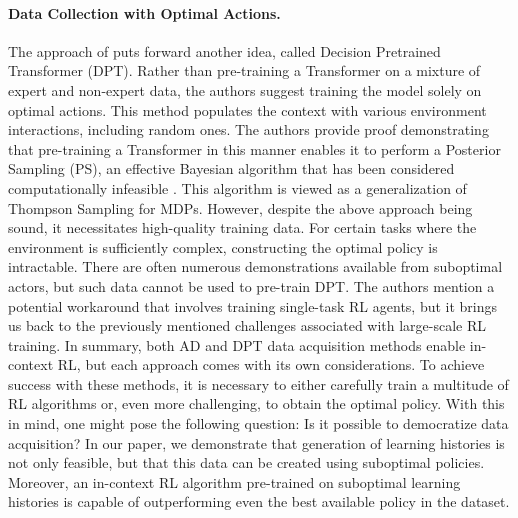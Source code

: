 \documentclass{article}
\theoremstyle{plain}
\theoremstyle{definition}
\theoremstyle{remark}
\begin{document}
\paragraph{Data Collection with Optimal Actions.}
The approach of \citet{lee2023supervised} puts forward another idea, called Decision Pretrained Transformer (DPT). Rather than pre-training a Transformer on a mixture of expert and non-expert data, the authors suggest training the model solely on optimal actions. This method populates the context with various environment interactions, including random ones. The authors provide proof demonstrating that pre-training a Transformer in this manner enables it to perform a Posterior Sampling (PS), an effective Bayesian algorithm that has been considered computationally infeasible \cite{osband2013more}. This algorithm is viewed as a generalization of Thompson Sampling for MDPs.
However, despite the above approach being sound, it necessitates high-quality training data. For certain tasks where the environment is sufficiently complex, constructing the optimal policy is intractable. There are often numerous demonstrations available from suboptimal actors, but such data cannot be used to pre-train DPT. The authors mention a potential workaround that involves training single-task RL agents, but it brings us back to the previously mentioned challenges associated with large-scale RL training.
In summary, both AD and DPT data acquisition methods enable in-context RL, but each approach comes with its own considerations. To achieve success with these methods, it is necessary to either carefully train a multitude of RL algorithms or, even more challenging, to obtain the optimal policy. With this in mind, one might pose the following question: Is it possible to democratize data acquisition? In our paper, we demonstrate that generation of learning histories is not only feasible, but that this data can be created using suboptimal policies. Moreover, an in-context RL algorithm pre-trained on suboptimal learning histories is capable of outperforming even the best available policy in the dataset.
\end{document}
